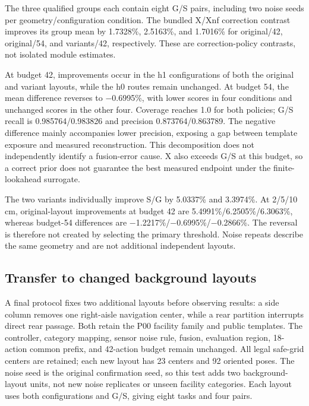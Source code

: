 \documentclass[11pt,a4paper]{article}
\providecommand{\hypertarget}[2]{#2}
\begin{document}
The three qualified groups each contain eight G/S pairs, including two noise seeds per geometry/configuration condition. The bundled X/Xnf correction contrast improves its group mean by 1.7328\%, 2.5163\%, and 1.7016\% for original/42, original/54, and variants/42, respectively. These are correction-policy contrasts, not isolated module estimates.

At budget 42, improvements occur in the h1 configurations of both the original and variant layouts, while the h0 routes remain unchanged. At budget 54, the mean difference reverses to \ensuremath{-}0.6995\%, with lower scores in four conditions and unchanged scores in the other four. Coverage reaches 1.0 for both policies; G/S recall is 0.985764/0.983826 and precision 0.873764/0.863789. The negative difference mainly accompanies lower precision, exposing a gap between template exposure and measured reconstruction. This decomposition does not independently identify a fusion-error cause. X also exceeds G/S at this budget, so a correct prior does not guarantee the best measured endpoint under the finite-lookahead surrogate.

The two variants individually improve S/G by 5.0337\% and 3.3974\%. At 2/5/10 cm, original-layout improvements at budget 42 are 5.4991\%/6.2505\%/6.3063\%, whereas budget-54 differences are \ensuremath{-}1.2217\%/\ensuremath{-}0.6995\%/\ensuremath{-}0.2866\%. The reversal is therefore not created by selecting the primary threshold. Noise repeats describe the same geometry and are not additional independent layouts.



\hypertarget{transfer-to-changed-background-layouts}{%
\subsection{Transfer to changed background layouts}\label{transfer-to-changed-background-layouts}}

A final protocol fixes two additional layouts before observing results: a side column removes one right-aisle navigation center, while a rear partition interrupts direct rear passage. Both retain the P00 facility family and public templates. The controller, category mapping, sensor noise rule, fusion, evaluation region, 18-action common prefix, and 42-action budget remain unchanged. All legal safe-grid centers are retained; each new layout has 23 centers and 92 oriented poses. The noise seed is the original confirmation seed, so this test adds two background-layout units, not new noise replicates or unseen facility categories. Each layout uses both configurations and G/S, giving eight tasks and four pairs.
\end{document}
